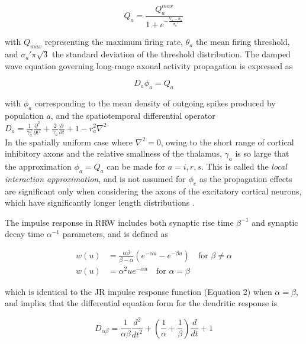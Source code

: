 \documentclass[12pt,twoside]{article}
\begin{document}
\begin{equation}
    Q_a=\frac{Q_a^{max}}{1+e^{-\frac{V_a-\theta_a}{\sigma_a'}}}
\end{equation}

with $Q_{max}$ representing the maximum firing rate, $\theta_{a}$ the mean firing threshold, and $\sigma_a'\pi \sqrt{3}$ the standard deviation of the threshold distribution. The damped wave equation governing long-range axonal activity propagation is expressed as

\begin{equation}
    D_a \phi_a=Q_a
\end{equation}

with $\phi_a$ corresponding to the mean density of outgoing spikes produced by population $a$, and the spatiotemporal differential operator $D_a=\frac{1}{\gamma_a^2} \frac{\partial^2}{\partial t^2}+ \frac{2}{\gamma_a} \frac{\partial}{\partial t} + 1- r_a^2 \nabla^2$ \\

In the spatially uniform case where $\nabla^2=0$, owing to the short range of cortical inhibitory axons and the relative smallness of the thalamus, $\gamma_a$ is so large that the approximation $\phi_a=Q_a$ can be made for $a=i,r,s$. This is called the \textit{local interaction approximation}, and is not assumed for $\phi_e$ as the propagation effects are significant only when considering the axons of the excitatory cortical neurons, which have significantly longer length distributions \citep{robinson2001prediction, robinson2002dynamics, sanz2017multistability}.

The impulse response in RRW includes both synaptic rise time $\beta^{-1}$ and synaptic decay time $\alpha^{-1}$ parameters, and is defined as

\begin{equation}
    \begin{aligned}
    w(u) &=\frac{\alpha \beta}{\beta - \alpha}(e^{-\alpha u} - e^{-\beta u}) \quad \text{for } \beta \neq \alpha \\
    w(u) &= \alpha ^{2}ue^{-\alpha u} \quad \text{for } \alpha = \beta
    \end{aligned}
\end{equation}

which is identical to the JR impulse response function (Equation 2) when $\alpha = \beta$, and implies that the differential equation form for the dendritic response is

\begin{equation}
    D_{\alpha \beta} =  \frac{1}{\alpha \beta}  \frac{d^2}{dt^2}+\left(\frac{1}{\alpha}+\frac{1}{\beta}\right) \frac{d}{dt}+1
\end{equation}
\end{document}
